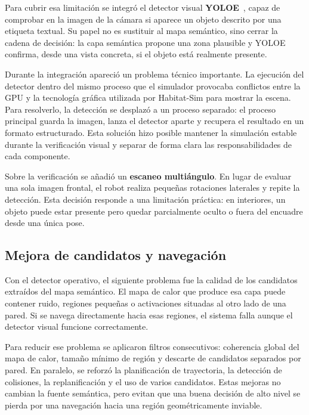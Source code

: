 \documentclass[11pt,fleqn,openany]{book} %
\let\cite=\parencite
\begin{document}
Para cubrir esa limitación se integró el detector visual \textbf{YOLOE}~\cite{wang2025yoloe}, capaz de comprobar en la imagen de la cámara si aparece un objeto descrito por una etiqueta textual. Su papel no es sustituir al mapa semántico, sino cerrar la cadena de decisión: la capa semántica propone una zona plausible y YOLOE confirma, desde una vista concreta, si el objeto está realmente presente.

Durante la integración apareció un problema técnico importante. La ejecución del detector dentro del mismo proceso que el simulador provocaba conflictos entre la GPU y la tecnología gráfica utilizada por Habitat-Sim para mostrar la escena. Para resolverlo, la detección se desplazó a un proceso separado: el proceso principal guarda la imagen, lanza el detector aparte y recupera el resultado en un formato estructurado. Esta solución hizo posible mantener la simulación estable durante la verificación visual y separar de forma clara las responsabilidades de cada componente.

Sobre la verificación se añadió un \textbf{escaneo multiángulo}. En lugar de evaluar una sola imagen frontal, el robot realiza pequeñas rotaciones laterales y repite la detección. Esta decisión responde a una limitación práctica: en interiores, un objeto puede estar presente pero quedar parcialmente oculto o fuera del encuadre desde una única pose.

\subsection*{Mejora de candidatos y navegación}

Con el detector operativo, el siguiente problema fue la calidad de los candidatos extraídos del mapa semántico. El mapa de calor que produce esa capa puede contener ruido, regiones pequeñas o activaciones situadas al otro lado de una pared. Si se navega directamente hacia esas regiones, el sistema falla aunque el detector visual funcione correctamente.

Para reducir ese problema se aplicaron filtros consecutivos: coherencia global del mapa de calor, tamaño mínimo de región y descarte de candidatos separados por pared. En paralelo, se reforzó la planificación de trayectoria, la detección de colisiones, la replanificación y el uso de varios candidatos. Estas mejoras no cambian la fuente semántica, pero evitan que una buena decisión de alto nivel se pierda por una navegación hacia una región geométricamente inviable.
\end{document}

